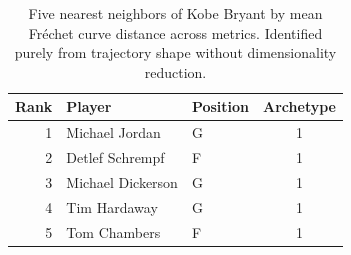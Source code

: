 \begin{table}[htbp]
  \centering\small
  \begin{tabular}{rllc}
    \toprule
    Rank & Player & Position & Archetype \\
    \midrule
    1 & Michael Jordan & G & 1 \\
    2 & Detlef Schrempf & F & 1 \\
    3 & Michael Dickerson & G & 1 \\
    4 & Tim Hardaway & G & 1 \\
    5 & Tom Chambers & F & 1 \\
    \bottomrule
  \end{tabular}
  \caption{Five nearest neighbors of Kobe Bryant by mean Fr\'{e}chet curve distance across metrics. Identified purely from trajectory shape without dimensionality reduction.}
  \label{tab:Kobe_Bryant_frechet_curve_neighbors}
\end{table}

